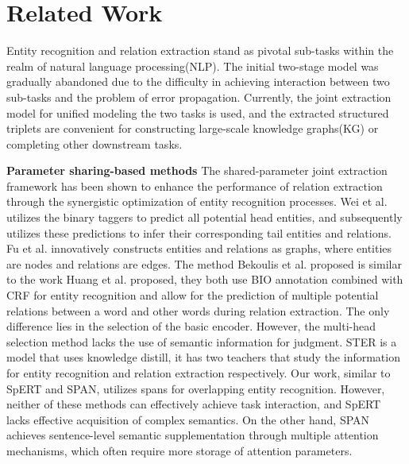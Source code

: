 \section{Related Work}
Entity recognition and relation extraction stand as pivotal sub-tasks within the realm of natural language processing(NLP). The initial two-stage model was gradually abandoned due to the difficulty in achieving interaction between two sub-tasks and the problem of error propagation. Currently, the joint extraction model for unified modeling the two tasks is used, and the extracted structured triplets are convenient for constructing large-scale knowledge graphs(KG) or completing other downstream tasks.    

\textbf{Parameter sharing-based methods} The shared-parameter joint extraction framework has been shown to enhance the performance of relation extraction through the synergistic optimization of entity recognition processes. Wei et al.\cite{wei-etal-2020-novel} utilizes the binary taggers to predict all potential head entities, and subsequently utilizes these predictions to infer their corresponding tail entities and relations. Fu et al.\cite{fu2019graphrel} innovatively constructs entities and relations as graphs, where entities are nodes and relations are edges. The method Bekoulis et al.\cite{bekoulis2018joint} proposed is similar to the work Huang et al.\cite{huang2019bert} proposed, they both use BIO annotation combined with CRF for entity recognition and allow for the prediction of multiple potential relations between a word and other words during relation extraction. The only difference lies in the selection of the basic encoder. However, the multi-head selection method lacks the use of semantic information for judgment. STER\cite{zhao2022exploring} is a model that uses knowledge distill, it has two teachers that study the information for entity recognition and relation extraction respectively. Our work, similar to SpERT\cite{Eberts2019SpanbasedJE} and SPAN\cite{ji2020span}, utilizes spans for overlapping entity recognition. However, neither of these methods can effectively achieve task interaction, and SpERT lacks effective acquisition of complex semantics. On the other hand, SPAN achieves sentence-level semantic supplementation through multiple attention mechanisms, which often require more storage of attention parameters.

